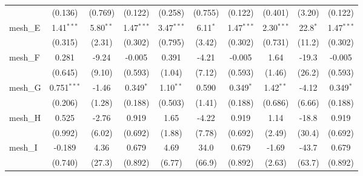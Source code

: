 \begin{tabular}{lccccccccc}
                                                               & (0.136)        & (0.769)        & (0.122)        & (0.258)        & (0.755)       & (0.122)        & (0.401)        & (3.20)         & (0.122)\\   
   mesh\_E                                                     & 1.41$^{***}$   & 5.80$^{**}$    & 1.47$^{***}$   & 3.47$^{***}$   & 6.11$^{*}$    & 1.47$^{***}$   & 2.30$^{***}$   & 22.8$^{*}$     & 1.47$^{***}$\\   
                                                               & (0.315)        & (2.31)         & (0.302)        & (0.795)        & (3.42)        & (0.302)        & (0.731)        & (11.2)         & (0.302)\\   
   mesh\_F                                                     & 0.281          & -9.24          & -0.005         & 0.391          & -4.21         & -0.005         & 1.64           & -19.3          & -0.005\\   
                                                               & (0.645)        & (9.10)         & (0.593)        & (1.04)         & (7.12)        & (0.593)        & (1.46)         & (26.2)         & (0.593)\\   
   mesh\_G                                                     & 0.751$^{***}$  & -1.46          & 0.349$^{*}$    & 1.10$^{**}$    & 0.590         & 0.349$^{*}$    & 1.42$^{**}$    & -4.12          & 0.349$^{*}$\\   
                                                               & (0.206)        & (1.28)         & (0.188)        & (0.503)        & (1.41)        & (0.188)        & (0.686)        & (6.66)         & (0.188)\\   
   mesh\_H                                                     & 0.525          & -2.76          & 0.919          & 1.65           & -4.22         & 0.919          & 1.14           & -18.8          & 0.919\\   
                                                               & (0.992)        & (6.02)         & (0.692)        & (1.88)         & (7.78)        & (0.692)        & (2.49)         & (30.4)         & (0.692)\\   
   mesh\_I                                                     & -0.189         & 4.36           & 0.679          & 4.69           & 34.0          & 0.679          & -1.69          & -43.7          & 0.679\\   
                                                               & (0.740)        & (27.3)         & (0.892)        & (6.77)         & (66.9)        & (0.892)        & (2.63)         & (63.7)         & (0.892)\\   

\end{tabular}
